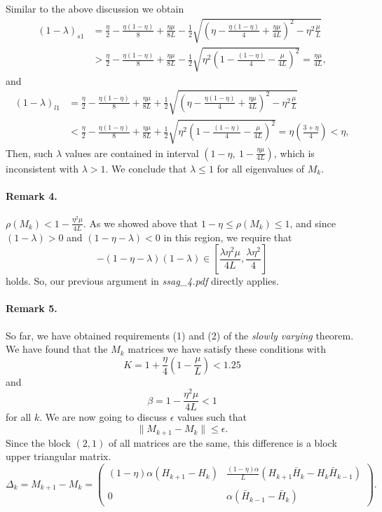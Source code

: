 \documentclass{article}
\begin{document}
Similar to the above discussion we obtain 
  \begin{align*}
   (1-\lambda)_{s1} &=\frac{\eta}{2}-\frac{\eta(1-\eta)}{8}+\frac{\eta\mu}{8L} -\frac{1}{2}\sqrt{\left(\eta-\frac{\eta(1-\eta)}{4}+\frac{\eta\mu}{4L}\right)^2-\eta^2\frac{\mu}{L}}\\ 
   &> \frac{\eta}{2}-\frac{\eta(1-\eta)}{8}+\frac{\eta\mu}{8L}-\frac{1}{2}\sqrt{\eta^2\left(1-\frac{(1-\eta)}{4}-\frac{\mu}{4L}\right)^2} = \frac{\eta\mu}{4L},
  \end{align*}
and
  \begin{align*}
   (1-\lambda)_{l1} &=\frac{\eta}{2}-\frac{\eta(1-\eta)}{8}+\frac{\eta\mu}{8L} +\frac{1}{2}\sqrt{\left(\eta-\frac{\eta(1-\eta)}{4}+\frac{\eta\mu}{4L}\right)^2-\eta^2\frac{\mu}{L}}\\ 
   &< \frac{\eta}{2}-\frac{\eta(1-\eta)}{8}+\frac{\eta\mu}{8L}+\frac{1}{2}\sqrt{\eta^2\left(1-\frac{(1-\eta)}{4}-\frac{\mu}{4L}\right)^2} = \eta(\frac{3+\eta}{4})<\eta,
  \end{align*}
Then, such $\lambda$ values are contained in interval $\left(\displaystyle 1-\eta , \ 1-\frac{\eta\mu}{4L}\right)$, which is inconsistent with $\lambda>1$.  We conclude that $\lambda\leq 1$ for all eigenvalues of $M_k$.
 
\bigskip

\paragraph{Remark 4.} $\rho(M_k)< 1-\displaystyle\frac{\eta^2\mu}{4L}$. As we showed above that $1-\eta\leq\rho(M_k)\leq 1$, and since $(1-\lambda)>0$ and $(1-\eta-\lambda)<0$ in this region, we require that 
\[
-(1-\eta-\lambda)(1-\lambda)\in[\frac{\lambda\eta^2\mu}{4L},\frac{\lambda\eta^2}{4}] 
\]
holds.  So, our previous argument in \emph{ssag\_4.pdf} directly applies.


\bigskip

\paragraph{Remark 5.} So far, we have obtained requirements (1) and (2) of the \emph{slowly varying} theorem.  We have found that the $M_k$ matrices we have satisfy these conditions with
\[
 K = 1 + \displaystyle\frac{\eta}{4}\left(1-\frac{\mu}{L}\right)<1.25
\]
and
\[
 \beta = 1-\displaystyle\frac{\eta^2\mu}{4L}<1
\]
for all $k$.  We are now going to discuss $\epsilon$ values such that
\[
 \|M_{k+1}-M_k\| \leq \epsilon.
\]
Since the block $(2,1)$ of all matrices are the same, this difference is a block upper triangular matrix. 
\[
 \Delta_k = M_{k+1}-M_k = \begin{pmatrix} (1-\eta)\alpha(H_{k+1}-H_k) & \displaystyle\frac{(1-\eta)\alpha}{L}(H_{k+1}\bar H_k-H_k\bar H_{k-1})\\  
 \\
                   0  & \alpha(\bar H_{k-1}-\bar H_k) \end{pmatrix}.
\]
\end{document}
